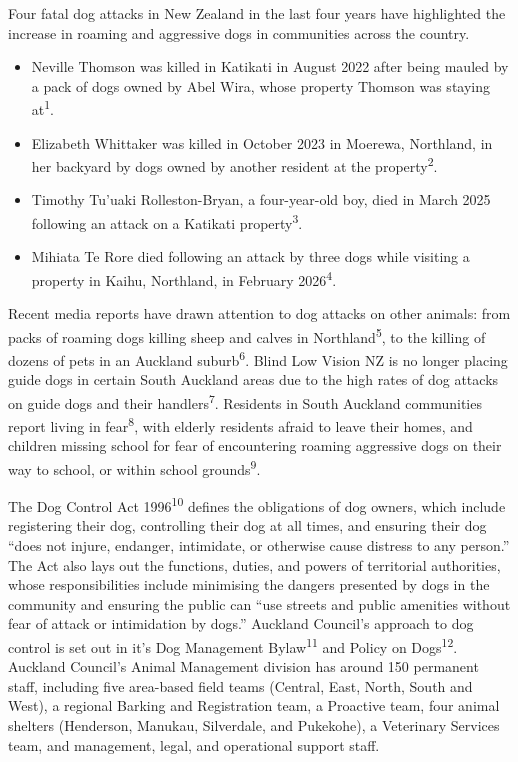 \documentclass[
  letterpaper,
  DIV=11,
  numbers=noendperiod]{scrartcl}
\providecommand{\tightlist}{%
  \setlength{\itemsep}{0pt}\setlength{\parskip}{0pt}}
\begin{document}
Four fatal dog attacks in New Zealand in the last four years have
highlighted the increase in roaming and aggressive dogs in communities
across the country.

\begin{itemize}
\tightlist
\item
  Neville Thomson was killed in Katikati in August 2022 after being
  mauled by a pack of dogs owned by Abel Wira, whose property Thomson
  was staying at\textsuperscript{1}.
\item
  Elizabeth Whittaker was killed in October 2023 in Moerewa, Northland,
  in her backyard by dogs owned by another resident at the
  property\textsuperscript{2}.
\item
  Timothy Tu'uaki Rolleston-Bryan, a four-year-old boy, died in March
  2025 following an attack on a Katikati property\textsuperscript{3}.
\item
  Mihiata Te Rore died following an attack by three dogs while visiting
  a property in Kaihu, Northland, in February 2026\textsuperscript{4}.
\end{itemize}

Recent media reports have drawn attention to dog attacks on other
animals: from packs of roaming dogs killing sheep and calves in
Northland\textsuperscript{5}, to the killing of dozens of pets in an
Auckland suburb\textsuperscript{6}. Blind Low Vision NZ is no longer
placing guide dogs in certain South Auckland areas due to the high rates
of dog attacks on guide dogs and their handlers\textsuperscript{7}.
Residents in South Auckland communities report living in
fear\textsuperscript{8}, with elderly residents afraid to leave their
homes, and children missing school for fear of encountering roaming
aggressive dogs on their way to school, or within school
grounds\textsuperscript{9}.

The Dog Control Act 1996\textsuperscript{10} defines the obligations of
dog owners, which include registering their dog, controlling their dog
at all times, and ensuring their dog ``does not injure, endanger,
intimidate, or otherwise cause distress to any person.'' The Act also
lays out the functions, duties, and powers of territorial authorities,
whose responsibilities include minimising the dangers presented by dogs
in the community and ensuring the public can ``use streets and public
amenities without fear of attack or intimidation by dogs.'' Auckland
Council's approach to dog control is set out in it's Dog Management
Bylaw\textsuperscript{11} and Policy on Dogs\textsuperscript{12}.
Auckland Council's Animal Management division has around 150 permanent
staff, including five area-based field teams (Central, East, North,
South and West), a regional Barking and Registration team, a Proactive
team, four animal shelters (Henderson, Manukau, Silverdale, and
Pukekohe), a Veterinary Services team, and management, legal, and
operational support staff.
\end{document}
